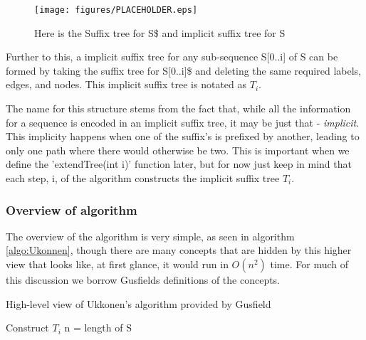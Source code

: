 \documentclass[12pt,twoside,notitlepage]{report}
\begin{document}
				\begin{figure}[h]
			\centerline{\texttt{[image: figures/PLACEHOLDER.eps]}}
			\caption{\label{fig:implicitSuffixTree} Here is the Suffix tree for S\$ and implicit suffix tree for S}
\end{figure}

				Further to this, a implicit suffix tree for any sub-sequence S[0..i] of S can be formed by taking the suffix tree for S[0..i]\$ and deleting the same required labels, edges, and nodes. This implicit suffix tree is notated as $T_i$.
				
				The name for this structure stems from the fact that, while all the information for a sequence is encoded in an implicit suffix tree, it may be just that - \emph{implicit}. This implicity happens when one of the suffix's is prefixed by another, leading to only one path where there would otherwise be two. This is important when we define the 'extendTree(int i)' function later, but for now just keep in mind that each step, i, of the algorithm constructs the implicit suffix tree $T_i$.
				
				\subsubsection{Overview of algorithm}
				The overview of the algorithm is very simple, as seen in algorithm \ref{algo:Ukonnen}, though there are many concepts that are hidden by this higher view that looks like, at first glance, it would run in $O(n^2)$ time. For much of this discussion we borrow Gusfields\cite{Gusfeild1999} definitions of the concepts.
				
				\begin{algorithm}
				\caption{High-level view of Ukkonen's algorithm provided by Gusfield\cite{Gusfield1975}}
				\label{algo:Ukonnen}
				\begin{algorithmic}[1]
						\State Construct $T_i$
						\State n = length of S
								

						\EndFor


					\EndProcedure
				\end{algorithmic}
				\end{algorithm}
				
\end{document}
